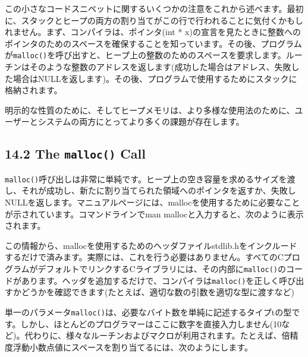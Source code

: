 この小さなコードスニペットに関するいくつかの注意をこれから述べます。最初に、スタックとヒープの両方の割り当てがこの行で行われることに気付くかもしれません。まず、コンパイラは、ポインタ(int
*
x)の宣言を見たときに整数へのポインタのためのスペースを確保することを知っています。その後、プログラムが\texttt{malloc()}を呼び出すと、ヒープ上の整数のためのスペースを要求します。ルーチンはそのような整数のアドレスを返します(成功した場合はアドレス、失敗した場合はNULLを返します)。その後、プログラムで使用するためにスタックに格納されます。

明示的な性質のために、そしてヒープメモリは、より多様な使用法のために、ユーザーとシステムの両方にとってより多くの課題が存在します。

\hypertarget{the-malloc-call}{%
\subsection*{\texorpdfstring{14.2 The \texttt{malloc()}
Call}{14.2 The malloc() Call}}\label{the-malloc-call}}

\texttt{malloc()}呼び出しは非常に単純です。ヒープ上の空き容量を求めるサイズを渡し、それが成功し、新たに割り当てられた領域へのポインタを返すか、失敗しNULLを返します。マニュアルページには、mallocを使用するために必要なことが示されています。コマンドラインでman
mallocと入力すると、次のように表示されます。

\begin{Shaded}
\begin{Highlighting}[]
\end{Highlighting}
\end{Shaded}

この情報から、mallocを使用するためのヘッダファイルstdlib.hをインクルードするだけで済みます。実際には、これを行う必要はありません。すべてのCプログラムがデフォルトでリンクするCライブラリには、その内部に\texttt{malloc()}のコードがあります。ヘッダを追加するだけで、コンパイラは\texttt{malloc()}を正しく呼び出すかどうかを確認できます(たとえば、適切な数の引数を適切な型に渡すなど)

単一のパラメータ\texttt{malloc()}は、必要なバイト数を単純に記述するタイプtの型です。しかし、ほとんどのプログラマーはここに数字を直接入力しません(10など)。代わりに、様々なルーチンおよびマクロが利用されます。たとえば、倍精度浮動小数点値にスペースを割り当てるには、次のようにします。

